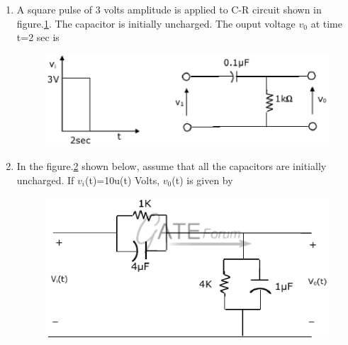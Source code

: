 \documentclass[journal,12pt,twocolumn]{IEEEtran}
\begin{document}
\begin{enumerate}
\item A square pulse of 3 volts amplitude is applied to C-R circuit shown in figure.\ref{fig63}. The
capacitor is initially uncharged. The ouput voltage $v_{0}$ at time t=2 sec is
\begin{enumerate}
\setlength\itemsep{2em}
\begin{figure}[!h]
\begin{center}
\includegraphics[scale=0.5]{./figs/fig63.eps}
\caption{}
\label{fig63}
\end{center}
\end{figure}
\end{enumerate}


\item In the figure.\ref{fig64} shown below, assume that all the capacitors are initially uncharged.
If $v_{i}$(t)=10u(t) Volts, $v_{0}$(t) is given by
\begin{enumerate}
\setlength\itemsep{2em}
\begin{figure}[!h]
\begin{center}
\includegraphics[scale=0.4]{./figs/fig64.eps}
\caption{}
\label{fig64}
\end{center}
\end{figure}
\end{enumerate}



\end{enumerate}
\end{document}
